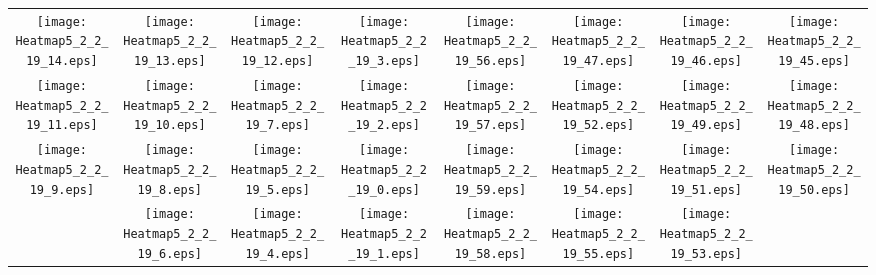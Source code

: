 \documentclass{standalone}
\begin{document}
\begin{tabular}{ *8{c} }
\texttt{[image: Heatmap5\_2\_2\_19\_14.eps]} & \texttt{[image: Heatmap5\_2\_2\_19\_13.eps]} & \texttt{[image: Heatmap5\_2\_2\_19\_12.eps]} & \texttt{[image: Heatmap5\_2\_2\_19\_3.eps]} & \texttt{[image: Heatmap5\_2\_2\_19\_56.eps]} & \texttt{[image: Heatmap5\_2\_2\_19\_47.eps]} & \texttt{[image: Heatmap5\_2\_2\_19\_46.eps]} & \texttt{[image: Heatmap5\_2\_2\_19\_45.eps]} \\
\texttt{[image: Heatmap5\_2\_2\_19\_11.eps]} & \texttt{[image: Heatmap5\_2\_2\_19\_10.eps]} & \texttt{[image: Heatmap5\_2\_2\_19\_7.eps]} & \texttt{[image: Heatmap5\_2\_2\_19\_2.eps]} & \texttt{[image: Heatmap5\_2\_2\_19\_57.eps]} & \texttt{[image: Heatmap5\_2\_2\_19\_52.eps]} & \texttt{[image: Heatmap5\_2\_2\_19\_49.eps]} & \texttt{[image: Heatmap5\_2\_2\_19\_48.eps]} \\
\texttt{[image: Heatmap5\_2\_2\_19\_9.eps]} & \texttt{[image: Heatmap5\_2\_2\_19\_8.eps]} & \texttt{[image: Heatmap5\_2\_2\_19\_5.eps]} & \texttt{[image: Heatmap5\_2\_2\_19\_0.eps]} & \texttt{[image: Heatmap5\_2\_2\_19\_59.eps]} & \texttt{[image: Heatmap5\_2\_2\_19\_54.eps]} & \texttt{[image: Heatmap5\_2\_2\_19\_51.eps]} & \texttt{[image: Heatmap5\_2\_2\_19\_50.eps]} \\
 & \texttt{[image: Heatmap5\_2\_2\_19\_6.eps]} & \texttt{[image: Heatmap5\_2\_2\_19\_4.eps]} & \texttt{[image: Heatmap5\_2\_2\_19\_1.eps]} & \texttt{[image: Heatmap5\_2\_2\_19\_58.eps]} & \texttt{[image: Heatmap5\_2\_2\_19\_55.eps]} & \texttt{[image: Heatmap5\_2\_2\_19\_53.eps]} &  
\end{tabular}
\end{document}
